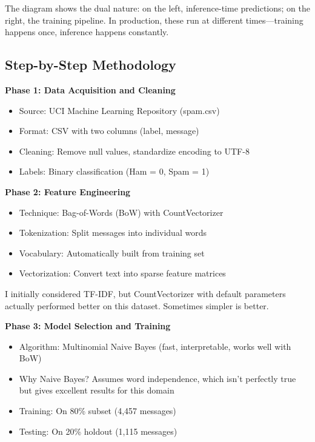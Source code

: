\documentclass[12pt, a4paper]{article}
\begin{document}
\begin{devnote}
    The diagram shows the dual nature: on the left, inference-time predictions; on the right, the training pipeline. In production, these run at different times—training happens once, inference happens constantly.
\end{devnote}

\subsection{Step-by-Step Methodology}

\textbf{Phase 1: Data Acquisition and Cleaning}

\begin{itemize}
    \item Source: UCI Machine Learning Repository (spam.csv)
    \item Format: CSV with two columns (label, message)
    \item Cleaning: Remove null values, standardize encoding to UTF-8
    \item Labels: Binary classification (Ham = 0, Spam = 1)
\end{itemize}

\textbf{Phase 2: Feature Engineering}

\begin{itemize}
    \item Technique: Bag-of-Words (BoW) with CountVectorizer
    \item Tokenization: Split messages into individual words
    \item Vocabulary: Automatically built from training set
    \item Vectorization: Convert text into sparse feature matrices
\end{itemize}

\begin{devnote}
    I initially considered TF-IDF, but CountVectorizer with default parameters actually performed better on this dataset. Sometimes simpler is better.
\end{devnote}

\textbf{Phase 3: Model Selection and Training}

\begin{itemize}
    \item Algorithm: Multinomial Naive Bayes (fast, interpretable, works well with BoW)
    \item Why Naive Bayes? Assumes word independence, which isn't perfectly true but gives excellent results for this domain
    \item Training: On 80\% subset (4,457 messages)
    \item Testing: On 20\% holdout (1,115 messages)
\end{itemize}
\end{document}
